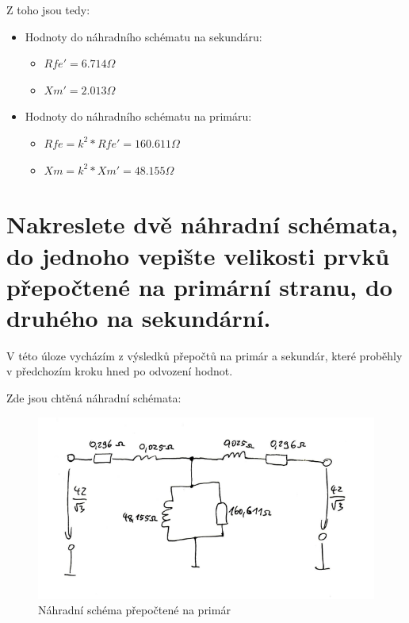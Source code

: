 \documentclass{protokol}
\begin{document}
Z toho jsou tedy:
\begin{itemize}
    \item Hodnoty do náhradního schématu na sekundáru:
    \begin{itemize}
        \item $Rfe' = 6.714 \Omega$
        \item $Xm' = 2.013 \Omega$
    \end{itemize}
    \item Hodnoty do náhradního schématu na primáru:
    \begin{itemize}
        \item $Rfe = k^2*Rfe' = 160.611 \Omega$
        \item $Xm = k^2*Xm' = 48.155 \Omega$
    \end{itemize}
\end{itemize}

\section{Nakreslete dvě náhradní schémata, do jednoho vepište velikosti prvků přepočtené
na primární stranu, do druhého na sekundární.}
V této úloze vycházím z výsledků přepočtů na primár a sekundár, které proběhly v předchozím kroku hned po odvození hodnot.

Zde jsou chtěná náhradní schémata:

\begin{figure}[H]
    \centering
    \includegraphics[width=1\linewidth]{PrepoctenoNaPrimar.png}
    \caption{Náhradní schéma přepočtené na primár}
    \label{fig:NahradniSchemaPrimar}
\end{figure}
\end{document}
